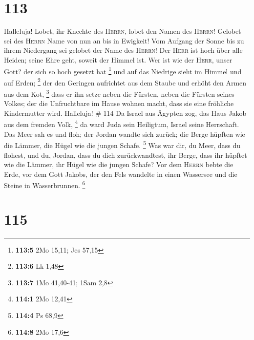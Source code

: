 \hypertarget{section-36}{%
\section{113}\label{section-36}}

 Halleluja! Lobet, ihr Knechte des \textsc{Herrn}, lobet
den Namen des \textsc{Herrn}!  Gelobet sei des
\textsc{Herrn} Name von nun an bis in Ewigkeit!  Vom
Aufgang der Sonne bis zu ihrem Niedergang sei gelobet der Name des
\textsc{Herrn}!  Der \textsc{Herr} ist hoch über alle
Heiden; seine Ehre geht, soweit der Himmel ist.  Wer ist
wie der \textsc{Herr}, unser Gott? der sich so hoch gesetzt hat
\footnote{\textbf{113:5} 2Mo 15,11; Jes 57,15}  und auf
das Niedrige sieht im Himmel und auf Erden; \footnote{\textbf{113:6} Lk
  1,48}  der den Geringen aufrichtet aus dem Staube und
erhöht den Armen aus dem Kot, \footnote{\textbf{113:7} 1Mo 41,40-41;
  1Sam 2,8}  dass er ihn setze neben die Fürsten, neben
die Fürsten seines Volkes;  der die Unfruchtbare im Hause
wohnen macht, dass sie eine fröhliche Kindermutter wird. Halleluja! \#
114  Da Israel aus Ägypten zog, das Haus Jakob aus dem
fremden Volk, \footnote{\textbf{114:1} 2Mo 12,41}  da ward
Juda sein Heiligtum, Israel seine Herrschaft.  Das Meer
sah es und floh; der Jordan wandte sich zurück;  die Berge
hüpften wie die Lämmer, die Hügel wie die jungen Schafe. \footnote{\textbf{114:4}
  Ps 68,9}  Was war dir, du Meer, dass du flohest, und du,
Jordan, dass du dich zurückwandtest,  ihr Berge, dass ihr
hüpftet wie die Lämmer, ihr Hügel wie die jungen Schafe? 
Vor dem \textsc{Herrn} bebte die Erde, vor dem Gott Jakobs,
 der den Fels wandelte in einen Wassersee und die Steine
in Wasserbrunnen. \footnote{\textbf{114:8} 2Mo 17,6}

\hypertarget{section-37}{%
\section{115}\label{section-37}}

